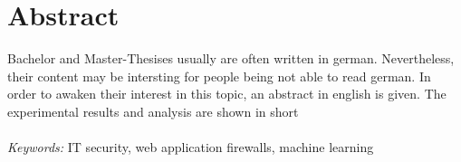 

\section*{Abstract}
Bachelor  and Master-Thesises usually  are often  written in  german. Nevertheless,
their content may be intersting for people  being not able to read german. In order
to  awaken their interest  in this  topic, an  abstract in  english is  given.  The
experimental results and analysis are shown in short \\\\

\emph{Keywords:} IT security, web application firewalls, machine learning


